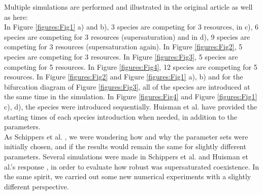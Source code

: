 Multiple simulations are performed and illustrated in the original article as well as here: \\
In Figure \ref{figures:Fig1} a) and b), 3 species are competing for 3 resources, in c), 6 species are competing for 3 resources (supersaturation) and in d), 9 species are competing for 3 resources (supersaturation again). In Figure \ref{figures:Fig2}, 5 species are competing for 3 resources. In Figure \ref{figures:Fig3}, 5 species are competing for 5 resources. In Figure \ref{figures:Fig4}, 12 species are competing for 5 resources. In Figure \ref{figures:Fig2} and Figure \ref{figures:Fig1} a), b) and for the bifurcation diagram of Figure \ref{figures:Fig3}, all of the species are introduced at the same time in the simulation. In Figure \ref{figures:Fig4} and Figure \ref{figures:Fig1} c), d), the species were introduced sequentially. Huisman et al. \cite{1999:Huisman} have provided the starting times of each species introduction when needed, in addition to the parameters.\\

As Schippers et al. \cite{2001:Schippers}, we were wondering how and why the parameter sets were initially chosen, and if the results would remain the same for slightly different parameters. Several simulations were made in Schippers et al. \cite{2001:Schippers} and Huisman et al.'s response \cite{2001:Huisman}, in order to evaluate how robust was supersaturated coexistence. In the same spirit, we carried out some new numerical experiments with a slightly different perspective.\\

